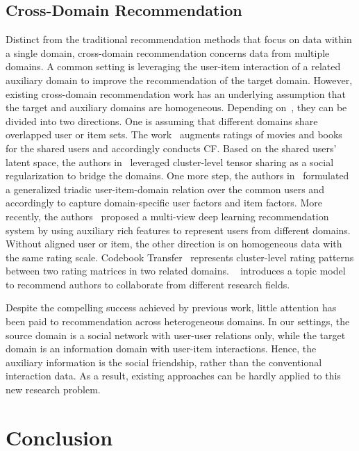 \documentclass[sigconf]{acmart}
\begin{document}
\subsection{Cross-Domain Recommendation}
Distinct from the traditional recommendation methods that focus on data within a single domain, cross-domain recommendation concerns data from multiple domains. A common setting is leveraging the user-item interaction of a related auxiliary domain to improve the recommendation of the target domain. However, existing cross-domain recommendation work has an underlying assumption that the target and auxiliary domains are homogeneous. Depending on~\cite{DBLP:conf/www/ElkahkySH15,DBLP:journals/tkde/JiangCCW0Y15,farseev2017crossdomain}, they can be divided into two directions. One is assuming that different domains share overlapped user or item sets. The work~\cite{DBLP:conf/um/SahebiB13} augments ratings of movies and books for the shared users and accordingly conducts CF. Based on the shared users' latent space, the authors in~\cite{DBLP:conf/kdd/ChenHL13} leveraged cluster-level tensor sharing as a social regularization to bridge the domains. One more step, the authors in~\cite{DBLP:conf/www/HuCXCGZ13} formulated a generalized triadic user-item-domain relation over the common users and accordingly to capture domain-specific user factors and item factors.
More recently, the authors~\cite{DBLP:conf/www/ElkahkySH15} proposed a multi-view deep learning recommendation system by using auxiliary rich features to represent users from different domains. Without aligned user or item, the other direction is on homogeneous data with the same rating scale. Codebook Transfer~\cite{DBLP:conf/ijcai/LiYX09} represents cluster-level rating patterns between two rating matrices in two related domains.
~\cite{DBLP:conf/kdd/TangWSS12} introduces a topic model to recommend authors to collaborate from different research fields.

Despite the compelling success achieved by previous work, little attention has been paid to recommendation across heterogeneous domains. In our settings, the source domain is a social network with user-user relations only, while the target domain is an information domain with user-item interactions. Hence, the auxiliary information is the social friendship, rather than the conventional interaction data. As a result, existing approaches can be hardly applied to this new research problem.

\section{Conclusion}
\end{document}
